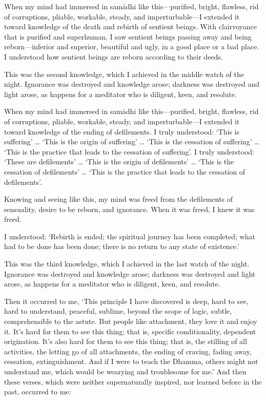 \documentclass[12pt,openany]{book}%
\begin{document}
When my mind had immersed in \textsanskrit{samādhi} like this—purified, bright, flawless, rid of corruptions, pliable, workable, steady, and imperturbable—I extended it toward knowledge of the death and rebirth of sentient beings. With clairvoyance that is purified and superhuman, I saw sentient beings passing away and being reborn—inferior and superior, beautiful and ugly, in a good place or a bad place. I understood how sentient beings are reborn according to their deeds. 

This was the second knowledge, which I achieved in the middle watch of the night. Ignorance was destroyed and knowledge arose; darkness was destroyed and light arose, as happens for a meditator who is diligent, keen, and resolute. 

When my mind had immersed in \textsanskrit{samādhi} like this—purified, bright, flawless, rid of corruptions, pliable, workable, steady, and imperturbable—I extended it toward knowledge of the ending of defilements. I truly understood: ‘This is suffering’ … ‘This is the origin of suffering’ … ‘This is the cessation of suffering’ … ‘This is the practice that leads to the cessation of suffering’. I truly understood: ‘These are defilements’ … ‘This is the origin of defilements’ … ‘This is the cessation of defilements’ … ‘This is the practice that leads to the cessation of defilements’. 

Knowing and seeing like this, my mind was freed from the defilements of sensuality, desire to be reborn, and ignorance. When it was freed, I knew it was freed. 

I understood: ‘Rebirth is ended; the spiritual journey has been completed; what had to be done has been done; there is no return to any state of existence.’ 

This was the third knowledge, which I achieved in the last watch of the night. Ignorance was destroyed and knowledge arose; darkness was destroyed and light arose, as happens for a meditator who is diligent, keen, and resolute. 

Then it occurred to me, ‘This principle I have discovered is deep, hard to see, hard to understand, peaceful, sublime, beyond the scope of logic, subtle, comprehensible to the astute. But people like attachment, they love it and enjoy it. It’s hard for them to see this thing; that is, specific conditionality, dependent origination. It’s also hard for them to see this thing; that is, the stilling of all activities, the letting go of all attachments, the ending of craving, fading away, cessation, extinguishment. And if I were to teach the Dhamma, others might not understand me, which would be wearying and troublesome for me.’ And then these verses, which were neither supernaturally inspired, nor learned before in the past, occurred to me: 
\end{document}
